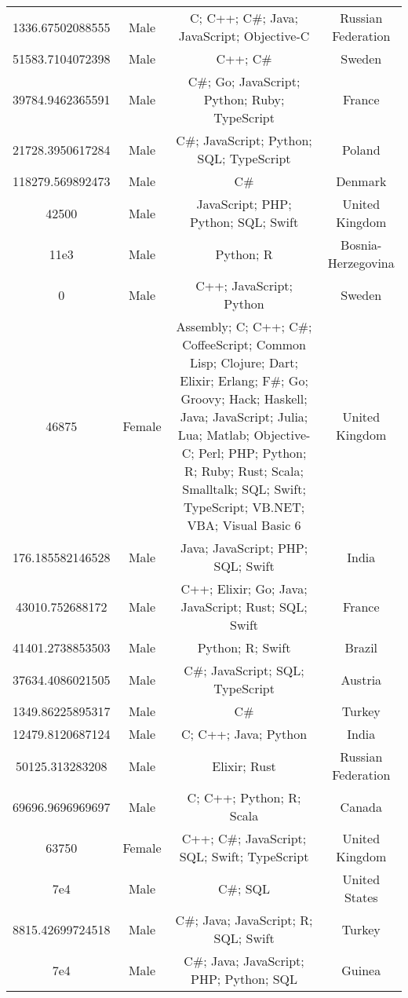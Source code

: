 \begin{center}
\begin{tabular}{ |c|c|c|c| }
1336.67502088555  &  Male  &  C; C++; C\#; Java; JavaScript; Objective-C  &  Russian Federation  \\ 
51583.7104072398  &  Male  &  C++; C\#  &  Sweden  \\ 
39784.9462365591  &  Male  &  C\#; Go; JavaScript; Python; Ruby; TypeScript  &  France  \\ 
21728.3950617284  &  Male  &  C\#; JavaScript; Python; SQL; TypeScript  &  Poland  \\ 
118279.569892473  &  Male  &  C\#  &  Denmark  \\ 
42500  &  Male  &  JavaScript; PHP; Python; SQL; Swift  &  United Kingdom  \\ 
11e3  &  Male  &  Python; R  &  Bosnia-Herzegovina  \\ 
0  &  Male  &  C++; JavaScript; Python  &  Sweden  \\ 
46875  &  Female  &  Assembly; C; C++; C\#; CoffeeScript; Common Lisp; Clojure; Dart; Elixir; Erlang; F\#; Go; Groovy; Hack; Haskell; Java; JavaScript; Julia; Lua; Matlab; Objective-C; Perl; PHP; Python; R; Ruby; Rust; Scala; Smalltalk; SQL; Swift; TypeScript; VB.NET; VBA; Visual Basic 6  &  United Kingdom  \\ 
176.185582146528  &  Male  &  Java; JavaScript; PHP; SQL; Swift  &  India  \\ 
43010.752688172  &  Male  &  C++; Elixir; Go; Java; JavaScript; Rust; SQL; Swift  &  France  \\ 
41401.2738853503  &  Male  &  Python; R; Swift  &  Brazil  \\ 
37634.4086021505  &  Male  &  C\#; JavaScript; SQL; TypeScript  &  Austria  \\ 
1349.86225895317  &  Male  &  C\#  &  Turkey  \\ 
12479.8120687124  &  Male  &  C; C++; Java; Python  &  India  \\ 
50125.313283208  &  Male  &  Elixir; Rust  &  Russian Federation  \\ 
69696.9696969697  &  Male  &  C; C++; Python; R; Scala  &  Canada  \\ 
63750  &  Female  &  C++; C\#; JavaScript; SQL; Swift; TypeScript  &  United Kingdom  \\ 
7e4  &  Male  &  C\#; SQL  &  United States  \\ 
8815.42699724518  &  Male  &  C\#; Java; JavaScript; R; SQL; Swift  &  Turkey  \\ 
7e4  &  Male  &  C\#; Java; JavaScript; PHP; Python; SQL  &  Guinea  \\ 

\end{tabular}
\end{center}
